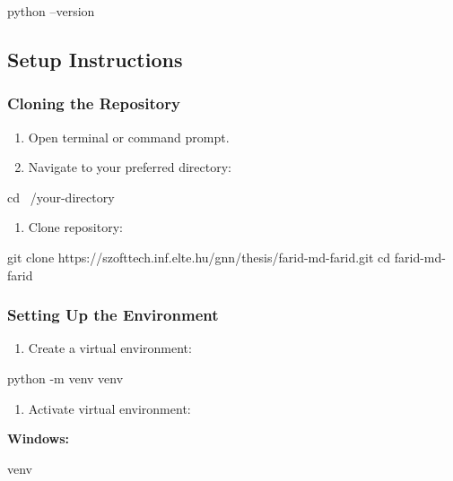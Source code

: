 \documentclass[12pt,a4paper,oneside]{report}
\begin{document}
\begin{codeblock}
python --version
\end{codeblock}

\subsection*{Setup Instructions}

\subsubsection*{Cloning the Repository}

\begin{enumerate}[leftmargin=2em]
    \item Open terminal or command prompt.
    \item Navigate to your preferred directory:
\end{enumerate}

\begin{codeblock}
cd ~/your-directory
\end{codeblock}

\begin{enumerate}[leftmargin=2em,start=3]
    \item Clone repository:
\end{enumerate}

\begin{codeblock}
git clone https://szofttech.inf.elte.hu/gnn/thesis/farid-md-farid.git
cd farid-md-farid
\end{codeblock}


\subsubsection*{Setting Up the Environment}

\begin{enumerate}[leftmargin=2em]
    \item Create a virtual environment:
\end{enumerate}

\begin{codeblock}
python -m venv venv
\end{codeblock}

\begin{enumerate}[leftmargin=2em,start=2]
    \item Activate virtual environment:
\end{enumerate}

\textbf{Windows:}
\begin{codeblock}
venv\Scripts\activate
\end{codeblock}
\end{document}
